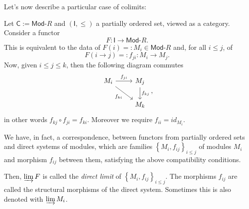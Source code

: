 Let's now describe a particular case of colimits:
\begin{ex}
	Let $\mathsf{C} := \mathsf{Mod}\text{-}R$ and $\left( \mathsf{I}, \leq \right)$ a partially ordered set, viewed as a category.
	Consider a functor
	\begin{equation}
	F: \mathsf{I} \to \mathsf{Mod}\text{-}R
	.\end{equation} 
	This is equivalent to the data of $F(i) =: M_i \in \mathsf{Mod}\text{-}R$ and, for all $i \leq j$, of
	\begin{equation}
		F(i \to j) =: f_{ji}: M_i \to M_j
	.\end{equation} 
	Now, given $i \leq j \leq k$, then the following diagram commutes
	\begin{equation}
	\begin{tikzcd}
		M_i \arrow[r, "f_{ji}", rightarrow] \arrow[rd, "f_{ki}"', rightarrow] &
		M_j \arrow[d, "f_{kj}", rightarrow] \\
		&
		M_k
	\end{tikzcd}
	,\end{equation} 
	in other words $f_{kj} \circ f_{ji} = f_{ki}$. Moreover we require $f_{ii} = id_{M_i}$.

	We have, in fact, a correspondence, between functors from partially ordered sets and
	direct systems of modules, which are families $\left\{ M_i, f_{ij} \right\}_{i \leq j}$ of modules $M_i$ and morphism $f_{ij}$ between them, satisfying the above compatibility conditions.

	Then, $\varinjlim F$ is called the {\em direct limit} of $\left\{ M_i, f_{ij} \right\}_{i \leq j}$.
	The morphisms $f_{ij}$ are called the structural morphisms of the direct system.
	Sometimes this is also denoted with $\varinjlim M_i$.
	

\end{ex}
